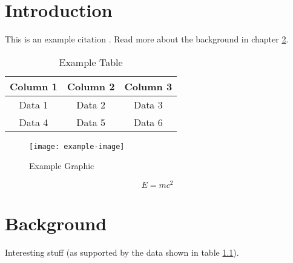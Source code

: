 \chapter{Introduction}

This is an example citation \cite{knuth97}.
Read more about the background in chapter \ref{ch:background}.

\begin{table}[h!]
    \centering
    \begin{tabular}{|c|c|c|}
        \hline
        Column 1 & Column 2 & Column 3 \\ \hline
        Data 1   & Data 2   & Data 3   \\ \hline
        Data 4   & Data 5   & Data 6   \\ \hline
    \end{tabular}
    \caption{Example Table}
    \label{tab:example_table}
\end{table}

\begin{figure}[h!]
    \centering
    \texttt{[image: example-image]} %
    \caption{Example Graphic}
    \label{fig:example_graphic}
\end{figure}

\begin{equation}
    E = mc^2
    \label{eq:example_formula}
\end{equation}

\chapter{Background} \label{ch:background}

Interesting stuff (as supported by the data shown in table \ref{tab:example_table}).
